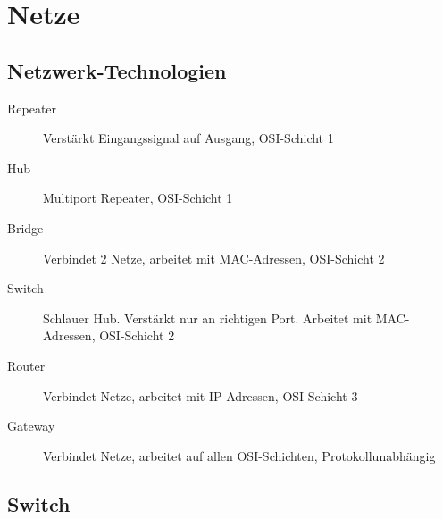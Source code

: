 \documentclass[12pt,a4paper]{article}
\begin{document}
	\section{Netze}
		\subsection{Netzwerk-Technologien}
			\begin{description}
				\item[Repeater] Verstärkt Eingangssignal auf Ausgang, OSI-Schicht 1
				\item[Hub] Multiport Repeater, OSI-Schicht 1
				\item[Bridge] Verbindet 2 Netze, arbeitet mit MAC-Adressen, OSI-Schicht 2 
				\item[Switch] Schlauer Hub. Verstärkt nur an richtigen Port. Arbeitet mit MAC-Adressen, OSI-Schicht 2 
				\item[Router] Verbindet Netze, arbeitet mit IP-Adressen, OSI-Schicht 3
				\item[Gateway] Verbindet Netze, arbeitet auf allen OSI-Schichten, Protokollunabhängig 
			\end{description}

		\subsection{Switch}
\end{document}
